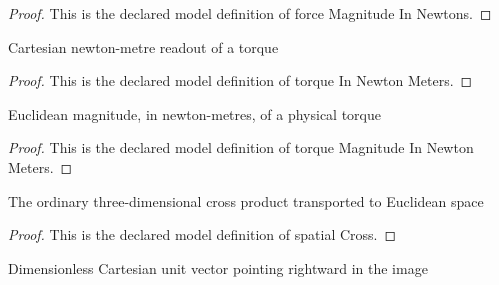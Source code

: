 \begin{proof}
  This is the declared model definition of force Magnitude In Newtons.
\end{proof}
\begin{definition}
  \label{def:physics:phyx-mini-0823:phyxminiproblems-problemphyxmini0823-torqueinnewtonmeters}
  Cartesian newton-metre readout of a torque
\end{definition}
\begin{proof}
  This is the declared model definition of torque In Newton Meters.
\end{proof}
\begin{definition}
  \label{def:physics:phyx-mini-0823:phyxminiproblems-problemphyxmini0823-torquemagnitudeinnewtonmeters}
  Euclidean magnitude, in newton-metres, of a physical torque
\end{definition}
\begin{proof}
  This is the declared model definition of torque Magnitude In Newton Meters.
\end{proof}
\begin{definition}
  \label{def:physics:phyx-mini-0823:phyxminiproblems-problemphyxmini0823-spatialcross}
  The ordinary three-dimensional cross product transported to Euclidean space
\end{definition}
\begin{proof}
  This is the declared model definition of spatial Cross.
\end{proof}
\begin{definition}[x Hat]
  \label{def:physics:phyx-mini-0823:phyxminiproblems-problemphyxmini0823-xhat}
  Dimensionless Cartesian unit vector pointing rightward in the image
\end{definition}
